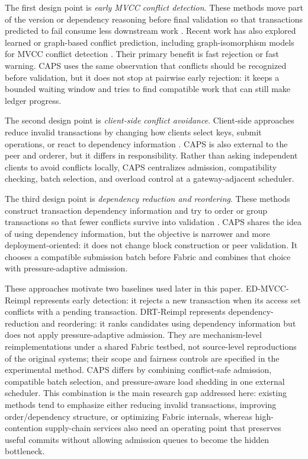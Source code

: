 \documentclass[fleqn,10pt,lineno]{wlpeerj}
\begin{document}
The first design point is \emph{early MVCC conflict detection}. These methods move part of the version or dependency reasoning before final validation so that transactions predicted to fail consume less downstream work \citep{trabelsi2023early,stoltidis2024highconflict}. Recent work has also explored learned or graph-based conflict prediction, including graph-isomorphism models for MVCC conflict detection \citep{alzahrani2025gin}. Their primary benefit is fast rejection or fast warning. CAPS uses the same observation that conflicts should be recognized before validation, but it does not stop at pairwise early rejection: it keeps a bounded waiting window and tries to find compatible work that can still make ledger progress.

The second design point is \emph{client-side conflict avoidance}. Client-side approaches reduce invalid transactions by changing how clients select keys, submit operations, or react to dependency information \citep{ji2024better}. CAPS is also external to the peer and orderer, but it differs in responsibility. Rather than asking independent clients to avoid conflicts locally, CAPS centralizes admission, compatibility checking, batch selection, and overload control at a gateway-adjacent scheduler.

The third design point is \emph{dependency reduction and reordering}. These methods construct transaction dependency information and try to order or group transactions so that fewer conflicts survive into validation \citep{ma2024key,kim2025dependency}. CAPS shares the idea of using dependency information, but the objective is narrower and more deployment-oriented: it does not change block construction or peer validation. It chooses a compatible submission batch before Fabric and combines that choice with pressure-adaptive admission.

These approaches motivate two baselines used later in this paper. ED-MVCC-Reimpl represents early detection: it rejects a new transaction when its access set conflicts with a pending transaction. DRT-Reimpl represents dependency-reduction and reordering: it ranks candidates using dependency information but does not apply pressure-adaptive admission. They are mechanism-level reimplementations under a shared Fabric testbed, not source-level reproductions of the original systems; their scope and fairness controls are specified in the experimental method. CAPS differs by combining conflict-safe admission, compatible batch selection, and pressure-aware load shedding in one external scheduler. This combination is the main research gap addressed here: existing methods tend to emphasize either reducing invalid transactions, improving order/dependency structure, or optimizing Fabric internals, whereas high-contention supply-chain services also need an operating point that preserves useful commits without allowing admission queues to become the hidden bottleneck.
\end{document}
